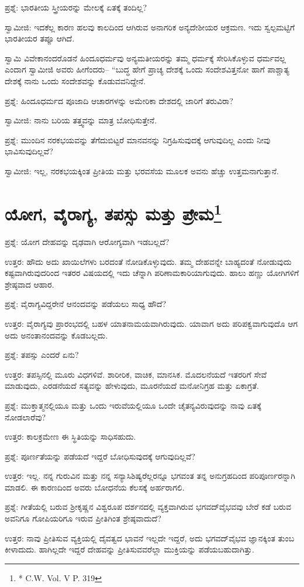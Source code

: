 ಪ್ರಶ್ನೆ: ಭಾರತೀಯ ಸ್ತ್ರೀಯರನ್ನು ಮೇಲಕ್ಕೆ ಏತಕ್ಕೆ ತಂದಿಲ್ಲ?

ಸ್ವಾಮೀಜಿ: ಇದಕೆಲ್ಲ ಕಾರಣ ಹಲವು ಕಾಲದಿಂದ ಆಗಿರುವ ಅನಾಗರಿಕ ಅನ್ಯದೇಶೀಯರ ಆಕ್ರಮಣ. ಇದು ಸ್ವಲ್ಪಮಟ್ಟಿಗೆ ಭಾರತೀಯರ ತಪ್ಪೂ ಆಗಿದೆ.

ಸ್ವಾಮಿ ವಿವೇಕಾನಂದರೊಡನೆ ಹಿಂದೂಧರ್ಮವು ಅನ್ಯಮತೀಯರನ್ನು ತಮ್ಮ ಧರ್ಮಕ್ಕೆ ಸೇರಿಸಿಕೊಳ್ಳುವ ಧರ್ಮವಲ್ಲ ಎಂದಾಗ ಸ್ವಾಮೀಜಿ ಅವರು ಹೀಗೆಂದರು– “ಬುದ್ಧ ಹೇಗೆ ಪ್ರಾಚ್ಯ ದೇಶಕ್ಕೆ ಒಂದು ಸಂದೇಶವಿತ್ತನೋ ಹಾಗೆ ಪಾಶ್ಚಾತ್ಯ ದೇಶಕ್ಕೆ ನಾನು ಒಂದು ಸಂದೇಶವನ್ನು ಕೊಡುವವನಿದ್ದೇನೆ.

ಪ್ರಶ್ನೆ: ಹಿಂದೂಧರ್ಮದ ಪೂಜಾದಿ ಆಚಾರಗಳನ್ನು ಅಮೇರಿಕಾ ದೇಶದಲ್ಲಿ ಜಾರಿಗೆ ತರುವಿರಾ?

ಸ್ವಾಮೀಜಿ: ನಾನು ಬರಿಯ ತತ್ತ್ವವನ್ನು ಮಾತ್ರ ಬೋಧಿಸುತ್ತೇನೆ.

ಪ್ರಶ್ನೆ: ಮುಂದಿನ ನರಕಭಯವನ್ನು ತೆಗೆದುಬಿಟ್ಟರೆ ಮಾನವನನ್ನು ನಿಗ್ರಹಿಸುವುದಕ್ಕೆ ಆಗುವುದಿಲ್ಲ ಎಂದು ನೀವು ಭಾವಿಸುವುದಿಲ್ಲವೆ?

ಸ್ವಾಮೀಜಿ: ಇಲ್ಲ, ನರಕಭಯಕ್ಕಿಂತ ಪ್ರೀತಿಯ ಮತ್ತು ಭರವಸೆಯ ಮೂಲಕ ಅವನು ಹೆಚ್ಚು ಉತ್ತಮನಾಗುತ್ತಾನೆ.


\section[ಯೋಗ, ವೈರಾಗ್ಯ, ತಪಸ್ಸು ಮತ್ತು ಪ್ರೇಮ]{ಯೋಗ, ವೈರಾಗ್ಯ, ತಪಸ್ಸು ಮತ್ತು ಪ್ರೇಮ\protect\footnote{* C.W. Vol. V P. 319}}

ಪ್ರಶ್ನೆ: ಯೋಗ ದೇಹವನ್ನು ದೃಢವಾಗಿ ಆರೋಗ್ಯವಾಗಿ ಇಡಬಲ್ಲದೆ?

ಉತ್ತರ: ಹೌದು ಅದು ಖಾಯಿಲೆಗಳು ಬರದಂತೆ ನೋಡಿಕೊಳ್ಳುವುದು. ತಮ್ಮ ದೇಹವನ್ನೇ ಬಾಹ್ಯದಂತೆ ನೋಡುವುದು ಕಷ್ಟವಾಗಿರುವುದರಿಂದ ಇತರರ ವಿಷಯದಲ್ಲಿ ಇದು ಚೆನ್ನಾಗಿ ಪರಿಣಾಮಕಾರಿಯಾಗುವುದು. ಹಾಲು ಹಣ್ಣು ಯೋಗಿಗಳಿಗೆ ಶ್ರೇಷ್ಠವಾದ ಆಹಾರ.

ಪ್ರಶ್ನೆ: ವೈರಾಗ್ಯವಿದ್ದರೇನೆ ಆನಂದವನ್ನು ಪಡೆಯಲು ಸಾಧ್ಯ ಹೌದೆ?

ಉತ್ತರ: ವೈರಾಗ್ಯವು ಪ್ರಾರಂಭದಲ್ಲಿ ಬಹಳ ಯಾತನಾಮಯವಾಗಿರುವುದು. ಯಾವಾಗ ಅದು ಪರಿಪಕ್ವವಾಗುವುದೊ ಆಗ ಅದು ಅನಂತಾನಂದವನ್ನು ಕೊಡಬಲ್ಲದು.

ಪ್ರಶ್ನೆ: ತಪಸ್ಸು ಎಂದರೆ ಏನು?

ಉತ್ತರ: ತಪಸ್ಸಿನಲ್ಲಿ ಮೂರು ವಿಧಗಳಿವೆ. ಶಾರೀರಿಕ, ವಾಚಿಕ, ಮಾನಸಿಕ. ಮೊದಲನೆಯದೆ ಇತರರಿಗೆ ಸೇವೆ ಮಾಡುವುದು, ಎರಡನೆಯದೆ ಸತ್ಯವನ್ನು ಹೇಳುವುದು, ಮೂರನೆಯದೆ ಮನೋನಿಗ್ರಹ ಮತ್ತು ಏಕಾಗ್ರತೆ.

ಪ್ರಶ್ನೆ: ಮುಕ್ತಾತ್ಮನಲ್ಲಿಯೂ ಮತ್ತು ಒಂದು ಇರುವೆಯಲ್ಲಿಯೂ ಒಂದೇ ಚೈತನ್ಯವಿರುವುದನ್ನು ನಾವು ಏತಕ್ಕೆ ನೋಡಲಾರೆವು?

ಉತ್ತರ: ಕಾಲಕ್ರಮೇಣ ಈ ಸ್ಥಿತಿಯನ್ನು ಸಾಧಿಸಹುದು.

ಪ್ರಶ್ನೆ: ಪೂರ್ಣತೆಯನ್ನು ಪಡೆಯದೆ ಇದ್ದರೆ ಬೋಧಿಸುವುದಕ್ಕೆ ಆಗುವುದಿಲ್ಲವೆ?

ಉತ್ತರ: ಇಲ್ಲ. ನನ್ನ ಗುರುವಿನ ಮತ್ತು ನನ್ನ ಸನ್ಯಾಸಿಶಿಷ್ಯರೆಲ್ಲರನ್ನೂ ಭಗವಂತ ತನ್ನ ಅನುಗ್ರಹದಿಂದ ಪರಿಪೂರ್ಣರನ್ನಾಗಿ ಮಾಡಲಿ. ಈ ಕಾರಣದಿಂದ ಅವರು ಬೋಧನೆಯ ಕೆಲಸಕ್ಕೆ ಅರ್ಹರಾಗಲಿ.

ಪ್ರಶ್ನೆ: ಗೀತೆಯಲ್ಲಿ ಬರುವ ಶ‍್ರೀಕೃಷ್ಣನ ವಿಶ್ವರೂಪ ದರ್ಶನದಲ್ಲಿ ವ್ಯಕ್ತವಾಗಿರುವ ಭಗವದ್​ವೈಭವವು ಬೇರೆ ಕಡೆ ಬರುವ ಅವನಿಗೂ ಗೋಪಿಯರಿಗೂ ಇರುವ ಪ್ರೀತಿಗಿಂತ ಶ್ರೇಷ್ಠವಾದುದೆ?

ಉತ್ತರ: ನಾವು ಪ್ರೀತಿಸುವ ವ್ಯಕ್ತಿಯಲ್ಲಿ ದೈವತ್ವದ ಭಾವನೆ ಇಲ್ಲದೇ ಇದ್ದರೆ, ಅದು ಭಗವದ್​ವೈಭವ ಜ್ಞಾನಕ್ಕಿಂತ ತುಂಬ ಕೀಳಾದುದು. ಹಾಗಿಲ್ಲದೇ ಇದ್ದರೆ ದೇಹವನ್ನು ಪ್ರೀತಿಸುವವರೆಲ್ಲಾ ಮುಕ್ತಿಯನ್ನು ಪಡೆಯಬಹುದಾಗಿತ್ತು.

